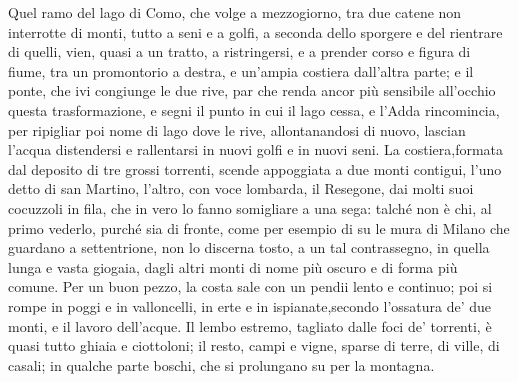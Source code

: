 \documentclass[11pt,a4paper]{book}
\begin{document}
\pstart
Quel ramo del lago di Como, che volge a mezzogiorno, tra due catene non interrotte di monti, tutto a seni e a golfi, a seconda dello sporgere e del rientrare di quelli, vien, quasi a un tratto, a ristringersi, e a prender corso e figura di fiume, tra un promontorio a destra, e un’ampia costiera dall’altra parte; e il ponte, che ivi congiunge le due rive, par che renda ancor più sensibile all’occhio questa trasformazione, e segni il punto in cui il lago cessa, e l’Adda rincomincia, per ripigliar poi nome di lago dove le rive, allontanandosi di nuovo, lascian l’acqua distendersi e rallentarsi in nuovi golfi e in nuovi seni. La costiera,formata dal deposito di tre grossi torrenti, scende appoggiata a due monti contigui, l’uno detto di san Martino, l’altro, con voce lombarda, il Resegone, dai molti suoi cocuzzoli in fila, che in vero lo fanno somigliare a una sega: talché non è chi, al primo vederlo, purché sia di fronte, come per esempio di su le mura di Milano che guardano a settentrione, non lo discerna tosto, a un tal contrassegno, in quella lunga e vasta giogaia, dagli altri monti di nome più oscuro e di forma più comune. Per un buon pezzo, la costa sale con un pendii lento e continuo; poi si rompe in poggi e in valloncelli, in erte e in ispianate,secondo l’ossatura de’ due monti, e il lavoro dell’acque. Il lembo estremo, tagliato dalle foci de’ torrenti, è quasi tutto ghiaia e ciottoloni; il resto, campi e vigne, sparse di terre, di ville, di casali; in qualche parte boschi, che si prolungano su per la montagna.
\pend
\endnumbering
\end{document}
